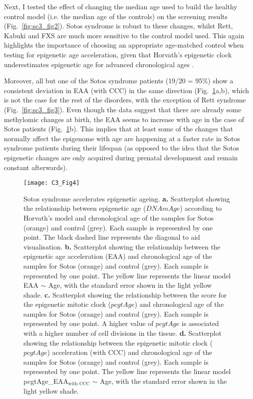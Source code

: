 Next, I tested the effect of changing the median age used to build the healthy control model (i.e. the median age of the controls) on the screening results (Fig.~\ref{fig:sc3_fig2}). Sotos syndrome is robust to these changes, whilst Rett, Kabuki and FXS are much more sensitive to the control model used. This again highlights the importance of choosing an appropriate age-matched control when testing for epigenetic age acceleration, given that Horvath’s epigenetic clock underestimates epigenetic age for advanced chronological ages \cite{ElKhoury2018,Marioni2018}.

\bigskip

Moreover, all but one of the Sotos syndrome patients (19/20 = 95\%) show a consistent deviation in EAA (with CCC) in the same direction (Fig.~\ref{fig:c3_fig4}a,b), which is not the case for the rest of the disorders, with the exception of Rett syndrome (Fig.~\ref{fig:sc3_fig3}). Even though the data suggest that there are already some methylomic changes at birth, the EAA seems to increase with age in the case of Sotos patients (Fig.~\ref{fig:c3_fig4}b). This implies that at least some of the changes that normally affect the epigenome with age are happening at a faster rate in Sotos syndrome patients during their lifespan (as opposed to the idea that the Sotos epigenetic changes are only acquired during prenatal development and remain constant afterwards).

\begin{figure}[htbp!] 
	\centering    
	\texttt{[image: C3\_Fig4]}
	\caption[Sotos syndrome accelerates epigenetic ageing]{Sotos syndrome accelerates epigenetic ageing. \textbf{a.} Scatterplot showing the relationship between epigenetic age ($DNAmAge$) according to Horvath’s model \cite{Horvath2013} and chronological age of the samples for Sotos (orange) and control (grey). Each sample is represented by one point. The black dashed line represents the diagonal to aid visualisation. \textbf{b.} Scatterplot showing the relationship between the epigenetic age acceleration (EAA) and chronological age of the samples for Sotos (orange) and control (grey). Each sample is represented by one point. The yellow line represents the linear model EAA $\sim$ Age, with the standard error shown in the light yellow shade. \textbf{c.} Scatterplot showing the relationship between the score for the epigenetic mitotic clock ($pcgtAge$) \cite{Yang2016} and chronological age of the samples for Sotos (orange) and control (grey). Each sample is represented by one point. A higher value of $pcgtAge$ is associated with a higher number of cell divisions in the tissue. \textbf{d.} Scatterplot showing the relationship between the epigenetic mitotic clock ($pcgtAge$) acceleration (with CCC) and chronological age of the samples for Sotos (orange) and control (grey). Each sample is represented by one point. The yellow line represents the linear model pcgtAge\_EAA$_{\text{with CCC}}$ $\sim$ Age, with the standard error shown in the light yellow shade.}
	\label{fig:c3_fig4}
\end{figure}

